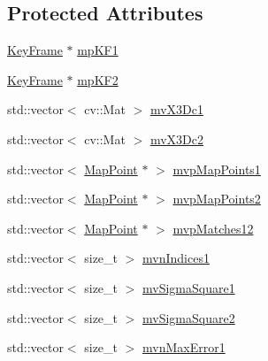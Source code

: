 \subsection*{Protected Attributes}
\begin{DoxyCompactItemize}
\item 
\mbox{\hyperlink{class_o_r_b___s_l_a_m2_1_1_key_frame}{Key\+Frame}} $\ast$ \mbox{\hyperlink{class_o_r_b___s_l_a_m2_1_1_sim3_solver_a719501a8d39a83a81a67d7334704f42c}{mp\+K\+F1}}
\item 
\mbox{\hyperlink{class_o_r_b___s_l_a_m2_1_1_key_frame}{Key\+Frame}} $\ast$ \mbox{\hyperlink{class_o_r_b___s_l_a_m2_1_1_sim3_solver_abc8fbea249fc4397c901694b7ecbe2bf}{mp\+K\+F2}}
\item 
std\+::vector$<$ cv\+::\+Mat $>$ \mbox{\hyperlink{class_o_r_b___s_l_a_m2_1_1_sim3_solver_a9674b6ca24874c387ebd38b9f1a4560a}{mv\+X3\+Dc1}}
\item 
std\+::vector$<$ cv\+::\+Mat $>$ \mbox{\hyperlink{class_o_r_b___s_l_a_m2_1_1_sim3_solver_afa91dd6da039c45e15d7713eae0c60b7}{mv\+X3\+Dc2}}
\item 
std\+::vector$<$ \mbox{\hyperlink{class_o_r_b___s_l_a_m2_1_1_map_point}{Map\+Point}} $\ast$ $>$ \mbox{\hyperlink{class_o_r_b___s_l_a_m2_1_1_sim3_solver_af4ea0c3fb99c1db31b40d4f0f0bcc749}{mvp\+Map\+Points1}}
\item 
std\+::vector$<$ \mbox{\hyperlink{class_o_r_b___s_l_a_m2_1_1_map_point}{Map\+Point}} $\ast$ $>$ \mbox{\hyperlink{class_o_r_b___s_l_a_m2_1_1_sim3_solver_a752181b1c6efe5cc79b0204af7edf44b}{mvp\+Map\+Points2}}
\item 
std\+::vector$<$ \mbox{\hyperlink{class_o_r_b___s_l_a_m2_1_1_map_point}{Map\+Point}} $\ast$ $>$ \mbox{\hyperlink{class_o_r_b___s_l_a_m2_1_1_sim3_solver_aa86f37922ef6499404aadc3b0a2526c7}{mvp\+Matches12}}
\item 
std\+::vector$<$ size\+\_\+t $>$ \mbox{\hyperlink{class_o_r_b___s_l_a_m2_1_1_sim3_solver_a81ad716802ccd2a3761882a796a0205d}{mvn\+Indices1}}
\item 
std\+::vector$<$ size\+\_\+t $>$ \mbox{\hyperlink{class_o_r_b___s_l_a_m2_1_1_sim3_solver_af44092ee71f95ec084db6b0144bbfc40}{mv\+Sigma\+Square1}}
\item 
std\+::vector$<$ size\+\_\+t $>$ \mbox{\hyperlink{class_o_r_b___s_l_a_m2_1_1_sim3_solver_afd96d2f2d32f1cda0e709c5b704f1f7b}{mv\+Sigma\+Square2}}
\item 
std\+::vector$<$ size\+\_\+t $>$ \mbox{\hyperlink{class_o_r_b___s_l_a_m2_1_1_sim3_solver_a5f739ba98d0da8c39c04e9396a697443}{mvn\+Max\+Error1}}

\end{DoxyCompactItemize}
